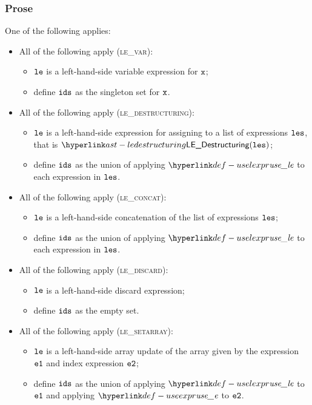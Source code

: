 \subsubsection{Prose}
One of the following applies:
\begin{itemize}
  \item All of the following apply (\textsc{le\_var}):
  \begin{itemize}
    \item $\texttt{le}$ is a left-hand-side variable expression for $\texttt{x}$;
    \item define $\texttt{ids}$ as the singleton set for $\texttt{x}$.
  \end{itemize}

  \item All of the following apply (\textsc{le\_destructuring}):
  \begin{itemize}
    \item $\texttt{le}$ is a left-hand-side expression for assigning to a list of expressions $\texttt{les}$,
          that is $\LEDestructuring(\vles)$;
    \item define $\texttt{ids}$ as the union of applying $\uselexpr$ to each expression in $\texttt{les}$.
  \end{itemize}

  \item All of the following apply (\textsc{le\_concat}):
  \begin{itemize}
    \item $\texttt{le}$ is a left-hand-side concatenation of the list of expressions $\texttt{les}$;
    \item define $\texttt{ids}$ as the union of applying $\uselexpr$ to each expression in $\texttt{les}$.
  \end{itemize}

  \item All of the following apply (\textsc{le\_discard}):
  \begin{itemize}
    \item $\texttt{le}$ is a left-hand-side discard expression;
    \item define $\texttt{ids}$ as the empty set.
  \end{itemize}

  \item All of the following apply (\textsc{le\_setarray}):
  \begin{itemize}
    \item $\texttt{le}$ is a left-hand-side array update of the array given by the expression $\texttt{e1}$ and index expression $\texttt{e2}$;
    \item define $\texttt{ids}$ as the union of applying $\uselexpr$ to $\texttt{e1}$ and applying $\useexpr$ to $\texttt{e2}$.
  \end{itemize}


\end{itemize}
